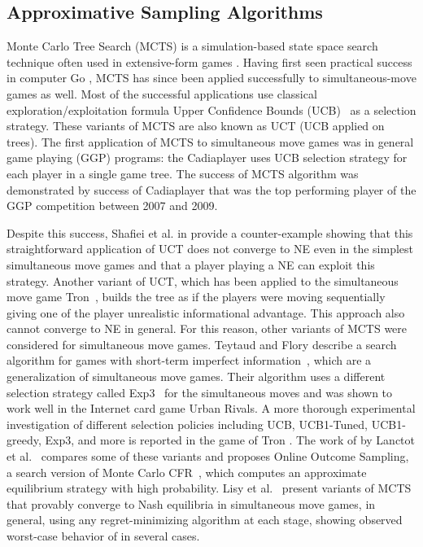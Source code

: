 \subsection{Approximative Sampling Algorithms}

Monte Carlo Tree Search (MCTS) is a simulation-based state space search technique often used in extensive-form games \cite{Coulom06,UCT}. 
Having first seen practical success in computer Go \cite{Gelly12}, MCTS has since been applied successfully to simultaneous-move games as well. 
Most of the successful applications use classical exploration/exploitation formula Upper Confidence Bounds (UCB)~\cite{UCB} as a selection strategy. These variants of MCTS are also known as UCT (UCB applied on trees). The first application of MCTS to simultaneous move games was in general game playing (GGP) \cite{Cadiaplayer} programs: the Cadiaplayer \cite{Cadiaplayer,Finnsson12} uses UCB selection strategy for each player in a single game tree. The success of MCTS algorithm was demonstrated by success of Cadiaplayer that was the top performing player of the GGP competition
between 2007 and 2009. 

Despite this success, Shafiei et al. in \cite{Shafiei09} provide a counter-example showing that this straightforward application of UCT does not
converge to NE even in the simplest simultaneous move games and that a player playing a NE can exploit this strategy. Another variant of UCT, which has been applied to the simultaneous move game Tron~\cite{Samothrakis10Tron}, builds the tree as if the players were moving sequentially giving one of the player unrealistic informational advantage. This approach also cannot converge to NE in general. For this reason, other variants of MCTS were considered for simultaneous move games. Teytaud and Flory describe a search algorithm for games with short-term imperfect information~\cite{Teytaud11Upper}, which are a generalization of simultaneous move games. Their algorithm uses a different selection strategy called Exp3~\cite{Auer2003Exp3} for the simultaneous moves and was shown to work well in the Internet card game Urban Rivals. 
A more thorough experimental investigation of different selection policies including UCB, UCB1-Tuned, UCB1-greedy, Exp3, and more is reported in the game of Tron \cite{Perick12Comparison}. The work of by Lanctot et al.~\cite{Lanctot13Goofspiel} compares some of these variants and proposes Online Outcome Sampling, a search version of Monte Carlo CFR~\cite{Lanctot09Sampling}, which computes an approximate equilibrium strategy with high probability. Lisy et al.~\cite{lisy2013-nips} present variants of MCTS that provably converge to Nash equilibria in simultaneous move games, in general, using any regret-minimizing algorithm at each stage, showing observed worst-case behavior of in several cases. 

